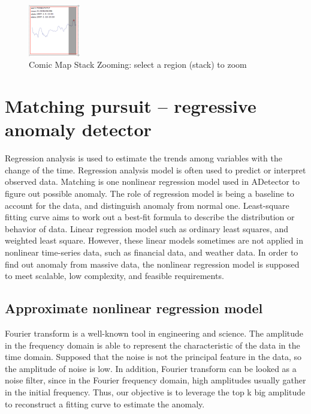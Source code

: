 \documentclass{vgtc}                          %
\begin{document}
\begin{figure}[htb]
	\centering
	\includegraphics[width=0.20\textwidth]{zoom.jpg}
	\caption{Comic Map Stack Zooming: select a region (stack) to zoom}
	\label{fig:zoom}
\end{figure}

\section{Matching pursuit -- regressive anomaly detector}

Regression analysis is used to estimate the trends among variables with the change of the time. Regression analysis model is often used to predict or interpret observed data. Matching is one nonlinear regression model used in ADetector to figure out possible anomaly. The role of regression model is being a baseline to account for the data, and distinguish anomaly from normal one. Least-square fitting curve aims to work out a best-fit formula to describe the distribution or behavior of data. Linear regression model such as ordinary least squares, and weighted least square. However, these linear models sometimes are not applied in nonlinear time-series data, such as financial data, and weather data. In order to find out anomaly from massive data, the nonlinear regression model is supposed to meet scalable, low complexity, and feasible requirements.

\subsection{Approximate nonlinear regression model}

Fourier transform is a well-known tool in engineering and science. The amplitude in the frequency domain is able to represent the characteristic of the data in the time domain. Supposed that the noise is not the principal feature in the data, so the amplitude of noise is low. In addition, Fourier transform can be looked as a noise filter, since in the Fourier frequency domain, high amplitudes usually gather in the initial frequency. Thus, our objective is to leverage the top k big amplitude to reconstruct a fitting curve to estimate the anomaly. 
\end{document}
